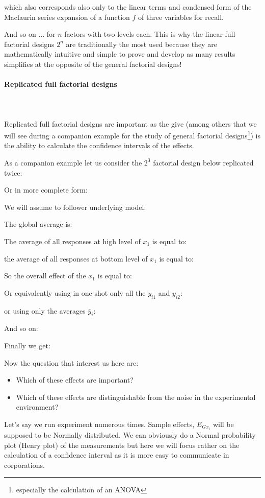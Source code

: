 	which also corresponds also only to the linear terms and condensed form of the Maclaurin series expansion of a function $f$ of three variables for recall.

	And so on ... for $n$ factors with two levels each. This is why the linear full factorial designs $2^n$ are traditionally the most used because they are mathematically intuitive and simple to prove and develop as many results simplifies at the opposite of the general factorial designs!

	\pagebreak
	\paragraph{Replicated full factorial designs}\mbox{}\\\\
	Replicated full factorial designs are important as the give (among others that we will see during a companion example for the study of general factorial designs\footnote{especially the calculation of an ANOVA}) is the ability to calculate the confidence intervals of the effects.
	
	As a companion example let us consider the $2^3$ factorial design below replicated twice:
	
	Or in more complete form:
		
	We will assume to follower underlying model:
	
	The global average is:
	
	The average of all responses at high level of $x_1$ is equal to:
	
	the average of all responses at bottom level of $x_1$ is equal to:
	
	So the overall effect of the $x_1$ is equal to:
	
	Or equivalently using in one shot only all the $y_{i1}$ and $y_{i2}$:
	
	or using only the averages $\bar{y}_i$:
	
	And so on:
	
	Finally we get:
	
	Now the question that interest us here are:
	\begin{itemize}
		\item Which of these effects are important?
		\item Which of these effects are distinguishable from the noise in the experimental environment?
	\end{itemize}
	Let's say we run experiment numerous times. Sample effects, $E_{Gx_i}$ will be supposed to be Normally distributed. We can obviously do a Normal probability plot (Henry plot) of the measurements but here we will focus rather on the calculation of a confidence interval as it is more easy to communicate in corporations.

